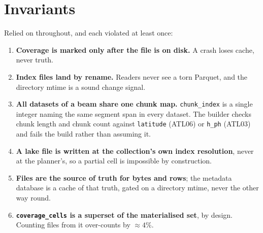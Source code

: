 \documentclass[11pt,a4paper]{article}
\newcommand{\code}[1]{\texttt{\small #1}}
\newcommand{\col}[1]{\texttt{\footnotesize #1}}
\begin{document}
\section{Invariants}

Relied on throughout, and each violated at least once:

\begin{enumerate}\setlength{\itemsep}{2pt}
\item \textbf{Coverage is marked only after the file is on disk.} A crash loses cache, never truth.
\item \textbf{Index files land by rename.} Readers never see a torn Parquet, and the directory mtime is a
  sound change signal.
\item \textbf{All datasets of a beam share one chunk map.} \col{chunk\_index} is a single integer naming the
  same segment span in every dataset. The builder checks chunk length and chunk count against
  \col{latitude} (ATL06) or \col{h\_ph} (ATL03) and fails the build rather than assuming it.
\item \textbf{A lake file is written at the collection's own index resolution}, never at the planner's, so a
  partial cell is impossible by construction.
\item \textbf{Files are the source of truth for bytes and rows}; the metadata database is a cache of that
  truth, gated on a directory mtime, never the other way round.
\item \textbf{\code{coverage\_cells} is a superset of the materialised set}, by design. Counting files from
  it over-counts by $\approx 4\%$.
\end{enumerate}
\end{document}
